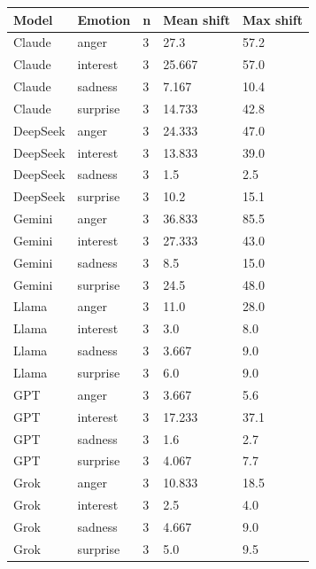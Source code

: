 \begin{tabular}{lllll}
\hline
Model & Emotion & n & Mean shift & Max shift \\
\hline
Claude & anger & 3 & 27.3 & 57.2 \\
Claude & interest & 3 & 25.667 & 57.0 \\
Claude & sadness & 3 & 7.167 & 10.4 \\
Claude & surprise & 3 & 14.733 & 42.8 \\
DeepSeek & anger & 3 & 24.333 & 47.0 \\
DeepSeek & interest & 3 & 13.833 & 39.0 \\
DeepSeek & sadness & 3 & 1.5 & 2.5 \\
DeepSeek & surprise & 3 & 10.2 & 15.1 \\
Gemini & anger & 3 & 36.833 & 85.5 \\
Gemini & interest & 3 & 27.333 & 43.0 \\
Gemini & sadness & 3 & 8.5 & 15.0 \\
Gemini & surprise & 3 & 24.5 & 48.0 \\
Llama & anger & 3 & 11.0 & 28.0 \\
Llama & interest & 3 & 3.0 & 8.0 \\
Llama & sadness & 3 & 3.667 & 9.0 \\
Llama & surprise & 3 & 6.0 & 9.0 \\
GPT & anger & 3 & 3.667 & 5.6 \\
GPT & interest & 3 & 17.233 & 37.1 \\
GPT & sadness & 3 & 1.6 & 2.7 \\
GPT & surprise & 3 & 4.067 & 7.7 \\
Grok & anger & 3 & 10.833 & 18.5 \\
Grok & interest & 3 & 2.5 & 4.0 \\
Grok & sadness & 3 & 4.667 & 9.0 \\
Grok & surprise & 3 & 5.0 & 9.5 \\
\hline
\end{tabular}
